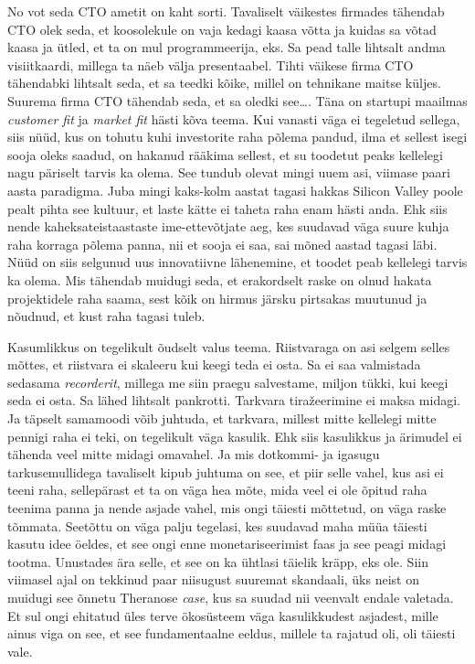 
No vot seda CTO ametit on kaht sorti. Tavaliselt väikestes firmades tähendab 
CTO olek seda, et koosolekule on vaja kedagi kaasa võtta ja kuidas sa võtad 
kaasa ja ütled, et ta on mul programmeerija, eks. Sa pead talle lihtsalt andma 
visiitkaardi, millega ta näeb välja presentaabel. Tihti väikese firma CTO 
tähendabki lihtsalt seda, et sa teedki kõike, millel on tehnikane maitse 
küljes. Suurema firma CTO tähendab seda, et sa oledki see\ldots. Täna on 
startupi maailmas \emph{customer fit} ja \emph{market fit} hästi kõva teema. 
Kui vanasti väga ei tegeletud sellega, siis nüüd, kus on tohutu kuhi 
investorite raha põlema pandud, ilma et sellest isegi sooja oleks saadud, on 
hakanud rääkima sellest, et su toodetut peaks kellelegi nagu päriselt
tarvis ka olema. See tundub olevat mingi uuem asi, viimase paari aasta 
paradigma. Juba mingi kaks-kolm aastat tagasi hakkas Silicon Valley poole pealt 
pihta see kultuur, et laste kätte ei taheta raha enam hästi anda. Ehk siis 
nende kaheksateistaastaste ime-ettevõtjate aeg, kes suudavad  väga suure kuhja 
raha 
korraga põlema panna, nii et sooja ei saa, sai mõned aastad 
tagasi läbi. Nüüd on siis selgunud uus innovatiivne lähenemine, et toodet peab 
kellelegi tarvis ka olema. Mis tähendab muidugi 
seda, et erakordselt raske on olnud hakata projektidele raha saama, sest kõik 
on hirmus järsku pirtsakas muutunud ja nõudnud, et kust raha tagasi tuleb. 


Kasumlikkus  on tegelikult õudselt valus teema. Riistvaraga on  
asi  selgem selles mõttes, et riistvara ei skaleeru kui keegi teda ei osta. Sa 
ei 
saa valmistada sedasama \emph{recorderit}, millega me siin praegu salvestame, 
miljon tükki, kui keegi seda ei osta. Sa lähed lihtsalt 
pankrotti. Tarkvara tiražeerimine ei maksa midagi. Ja täpselt samamoodi võib  
juhtuda, et tarkvara, millest mitte kellelegi mitte pennigi raha ei teki, on 
tegelikult väga kasulik. Ehk siis kasulikkus ja ärimudel ei tähenda veel mitte 
midagi omavahel. Ja mis dotkommi- ja igasugu tarkusemullidega tavaliselt kipub 
juhtuma on see, et piir selle vahel, kus asi ei teeni 
raha, sellepärast et ta on väga hea mõte, mida veel ei ole õpitud raha  
teenima panna ja nende asjade vahel, mis ongi täiesti mõttetud, on väga raske 
tõmmata. 
Seetõttu on väga palju tegelasi, kes suudavad maha müüa  täiesti kasutu idee 
öeldes, et see ongi enne monetariseerimist faas ja see peagi midagi tootma. 
Unustades ära selle, et see on ka ühtlasi täielik kräpp, eks ole. Siin  
viimasel ajal on tekkinud paar niisugust suuremat skandaali, üks neist on 
muidugi see õnnetu Theranose \emph{case}, kus sa suudad nii veenvalt endale 
valetada. Et sul ongi ehitatud üles terve ökosüsteem väga kasulikkudest 
asjadest, mille ainus viga on see, et see fundamentaalne eeldus, millele ta 
rajatud oli, oli täiesti vale. 

